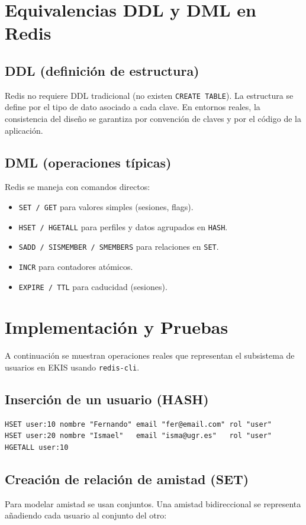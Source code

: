 \section{Equivalencias DDL y DML en Redis}

\subsection{DDL (definición de estructura)}
Redis no requiere DDL tradicional (no existen \texttt{CREATE TABLE}). La estructura se define por el tipo de dato asociado a cada clave. En entornos reales, la consistencia del diseño se garantiza por convención de claves y por el código de la aplicación.

\subsection{DML (operaciones típicas)}
Redis se maneja con comandos directos:
\begin{itemize}
    \item \texttt{SET / GET} para valores simples (sesiones, flags).
    \item \texttt{HSET / HGETALL} para perfiles y datos agrupados en \texttt{HASH}.
    \item \texttt{SADD / SISMEMBER / SMEMBERS} para relaciones en \texttt{SET}.
    \item \texttt{INCR} para contadores atómicos.
    \item \texttt{EXPIRE / TTL} para caducidad (sesiones).
\end{itemize}

\section{Implementación y Pruebas}

A continuación se muestran operaciones reales que representan el subsistema de usuarios en EKIS usando \texttt{redis-cli}.

\subsection{Inserción de un usuario (HASH)}
\begin{verbatim}
HSET user:10 nombre "Fernando" email "fer@email.com" rol "user"
HSET user:20 nombre "Ismael"   email "isma@ugr.es"   rol "user"
HGETALL user:10
\end{verbatim}

\subsection{Creación de relación de amistad (SET)}
Para modelar amistad se usan conjuntos. Una amistad bidireccional se representa añadiendo cada usuario al conjunto del otro:


